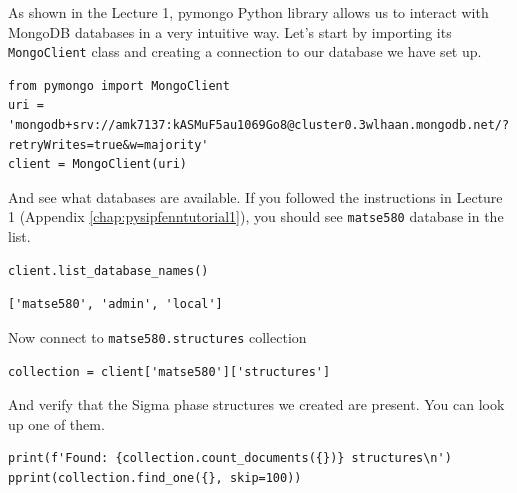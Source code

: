\label{pysipfenntutorial2:verify-the-connection-to-the-database}

As shown in the Lecture 1, pymongo Python library allows us to interact
with MongoDB databases in a very intuitive way. Let's start by importing
its \texttt{MongoClient} class and creating a
connection to our database we have set up.

\begin{verbatim}
from pymongo import MongoClient
uri = 'mongodb+srv://amk7137:kASMuF5au1069Go8@cluster0.3wlhaan.mongodb.net/?retryWrites=true&w=majority'
client = MongoClient(uri)
\end{verbatim}

And see what databases are available. If you followed the instructions
in Lecture 1 (Appendix \ref{chap:pysipfenntutorial1}), you should see \texttt{matse580} database
in the list.

\begin{verbatim}
client.list_database_names()
\end{verbatim}

\begin{verbatim}
['matse580', 'admin', 'local']
\end{verbatim}

Now connect to \texttt{matse580.structures} collection

\begin{verbatim}
collection = client['matse580']['structures']
\end{verbatim}

And verify that the Sigma phase structures we created are present. You can look up one of them.

\begin{verbatim}
print(f'Found: {collection.count_documents({})} structures\n')
pprint(collection.find_one({}, skip=100))
\end{verbatim}

